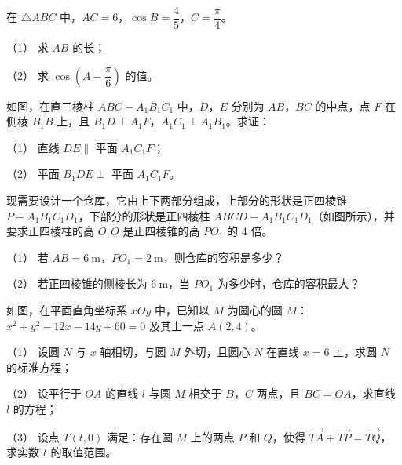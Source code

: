 \begin{question}
在 \(\triangle ABC\) 中，\(AC=6\)，\(\cos B=\dfrac{4}{5}\)，\(C=\dfrac{\pi}{4}\)。

（1） 求 \(AB\) 的长；

（2） 求 \(\cos\left(A-\dfrac{\pi}{6}\right)\) 的值。

\Needspace{0.4\textheight}
\end{question}
\begin{question}
如图，在直三棱柱 \(ABC-A_{1}B_{1}C_{1}\) 中，\(D\)，\(E\) 分别为 \(AB\)，\(BC\) 的中点，点 \(F\) 在侧棱 \(B_{1}B\) 上，且 \(B_{1}D\perp A_{1}F\)，\(A_{1}C_{1}\perp A_{1}B_{1}\)。求证：

（1） 直线 \(DE\parallel\) 平面 \(A_{1}C_{1}F\)；

（2） 平面 \(B_{1}DE\perp\) 平面 \(A_{1}C_{1}F\)。
\nopagebreak[4]
\begin{center}\end{center}
\nopagebreak[4]
\Needspace{0.4\textheight}
\end{question}
\begin{question}
现需要设计一个仓库，它由上下两部分组成，上部分的形状是正四棱锥 \(P-A_{1}B_{1}C_{1}D_{1}\)，下部分的形状是正四棱柱 \(ABCD-A_{1}B_{1}C_{1}D_{1}\)（如图所示），并要求正四棱柱的高 \(O_{1}O\) 是正四棱锥的高 \(PO_{1}\) 的 4 倍。

（1） 若 \(AB=6\ \mathrm{m}\)，\(PO_{1}=2\ \mathrm{m}\)，则仓库的容积是多少？

（2） 若正四棱锥的侧棱长为 \(6\ \mathrm{m}\)，当 \(PO_{1}\) 为多少时，仓库的容积最大？
\nopagebreak[4]
\begin{center}\end{center}
\nopagebreak[4]
\Needspace{0.4\textheight}
\end{question}
\begin{question}
如图，在平面直角坐标系 \(xOy\) 中，已知以 \(M\) 为圆心的圆 \(M\)：\(x^{2}+y^{2}-12x-14y+60=0\) 及其上一点 \(A(2,4)\)。

（1） 设圆 \(N\) 与 \(x\) 轴相切，与圆 \(M\) 外切，且圆心 \(N\) 在直线 \(x=6\) 上，求圆 \(N\) 的标准方程；

（2） 设平行于 \(OA\) 的直线 \(l\) 与圆 \(M\) 相交于 \(B\)，\(C\) 两点，且 \(BC=OA\)，求直线 \(l\) 的方程；

（3） 设点 \(T(t,0)\) 满足：存在圆 \(M\) 上的两点 \(P\) 和 \(Q\)，使得 \(\overrightarrow{TA}+\overrightarrow{TP}=\overrightarrow{TQ}\)，求实数 \(t\) 的取值范围。
\nopagebreak[4]
\begin{center}\end{center}
\nopagebreak[4]
\end{question}
